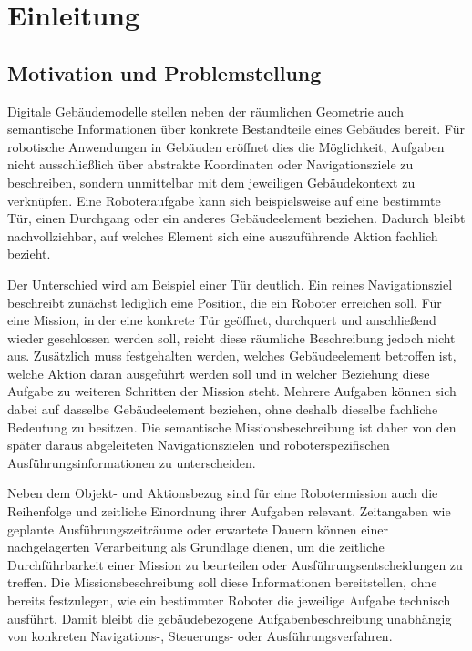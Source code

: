 
\section{Einleitung}\label{sec:Einleitung}

\subsection{Motivation und Problemstellung}

Digitale Gebäudemodelle stellen neben der räumlichen Geometrie auch semantische Informationen über
konkrete Bestandteile eines Gebäudes bereit. Für robotische Anwendungen in Gebäuden eröffnet dies
die Möglichkeit, Aufgaben nicht ausschließlich über abstrakte Koordinaten oder Navigationsziele zu
beschreiben, sondern unmittelbar mit dem jeweiligen Gebäudekontext zu verknüpfen. Eine
Roboteraufgabe kann sich beispielsweise auf eine bestimmte Tür, einen Durchgang oder ein anderes
Gebäudeelement beziehen. Dadurch bleibt nachvollziehbar, auf welches Element sich eine auszuführende
Aktion fachlich bezieht.

Der Unterschied wird am Beispiel einer Tür deutlich. Ein reines Navigationsziel beschreibt zunächst
lediglich eine Position, die ein Roboter erreichen soll. Für eine Mission, in der eine konkrete Tür
geöffnet, durchquert und anschließend wieder geschlossen werden soll, reicht diese räumliche
Beschreibung jedoch nicht aus. Zusätzlich muss festgehalten werden, welches Gebäudeelement betroffen
ist, welche Aktion daran ausgeführt werden soll und in welcher Beziehung diese Aufgabe zu weiteren
Schritten der Mission steht. Mehrere Aufgaben können sich dabei auf dasselbe Gebäudeelement
beziehen, ohne deshalb dieselbe fachliche Bedeutung zu besitzen. Die semantische
Missionsbeschreibung ist daher von den später daraus abgeleiteten Navigationszielen und
roboterspezifischen Ausführungsinformationen zu unterscheiden.

Neben dem Objekt- und Aktionsbezug sind für eine Robotermission auch die Reihenfolge und zeitliche
Einordnung ihrer Aufgaben relevant. Zeitangaben wie geplante Ausführungszeiträume oder erwartete
Dauern können einer nachgelagerten Verarbeitung als Grundlage dienen, um die zeitliche
Durchführbarkeit einer Mission zu beurteilen oder Ausführungsentscheidungen zu treffen. Die
Missionsbeschreibung soll diese Informationen bereitstellen, ohne bereits festzulegen, wie ein
bestimmter Roboter die jeweilige Aufgabe technisch ausführt. Damit bleibt die gebäudebezogene
Aufgabenbeschreibung unabhängig von konkreten Navigations-, Steuerungs- oder Ausführungsverfahren.


